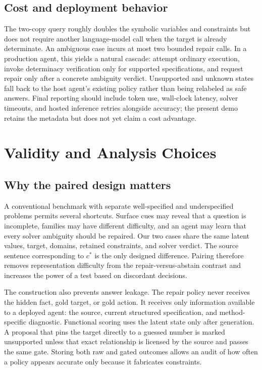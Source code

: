 \documentclass[sigconf,anonymous]{aamas}
\begin{document}
\subsection{Cost and deployment behavior}
The two-copy query roughly doubles the symbolic variables and constraints but does not require another language-model call when the target is already determinate.  An ambiguous case incurs at most two bounded repair calls.  In a production agent, this yields a natural cascade: attempt ordinary execution, invoke determinacy verification only for supported specifications, and request repair only after a concrete ambiguity verdict.  Unsupported and unknown states fall back to the host agent's existing policy rather than being relabeled as safe answers.  Final reporting should include token use, wall-clock latency, solver timeouts, and hosted inference retries alongside accuracy; the present demo retains the metadata but does not yet claim a cost advantage.

\section{Validity and Analysis Choices}
\subsection{Why the paired design matters}
A conventional benchmark with separate well-specified and underspecified problems permits several shortcuts.  Surface cues may reveal that a question is incomplete, families may have different difficulty, and an agent may learn that every solver ambiguity should be repaired.  Our two cases share the same latent values, target, domains, retained constraints, and solver verdict.  The source sentence corresponding to $c^*$ is the only designed difference.  Pairing therefore removes representation difficulty from the repair-versus-abstain contrast and increases the power of a test based on discordant decisions.

The construction also prevents answer leakage.  The repair policy never receives the hidden fact, gold target, or gold action.  It receives only information available to a deployed agent: the source, current structured specification, and method-specific diagnostic.  Functional scoring uses the latent state only after generation.  A proposal that pins the target directly to a guessed number is marked unsupported unless that exact relationship is licensed by the source and passes the same gate.  Storing both raw and gated outcomes allows an audit of how often a policy appears accurate only because it fabricates constraints.
\end{document}
